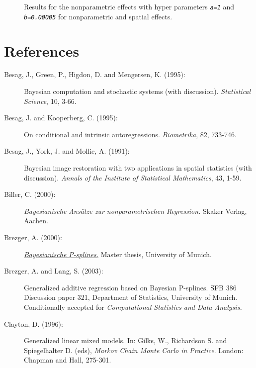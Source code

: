 \begin{figure}[ht]
\begin{center}
 {\it\caption{Results
for the nonparametric effects with hyper parameters {\em\tt a=1} and
{\em\tt b=0.00005} for nonparametric and spatial
effects.\label{zambia_mcmc_sensi3}}}
\end{center}
\end{figure}

\section{References}
\label{zambia_bayesregref}

\begin{description}

\item[Besag, J., Green, P., Higdon, D. and Mengersen, K. (1995):]
 Bayesian computation and stochastic systems (with discussion).
{\em Statistical Science}, 10, 3-66.

\item[Besag, J. and Kooperberg, C. (1995):] On conditional and intrinsic autoregressions.
{\em Biometrika}, 82, 733-746.

\item[Besag, J., York, J. and Mollie, A. (1991):]
Bayesian image restoration with two applications in spatial
statistics (with discussion). {\em Annals of the Institute of
Statistical Mathematics}, 43, 1-59.

\item[Biller, C. (2000):] {\em Bayesianische Ans\"atze zur nonparametrischen Regression.}
Skaker Verlag, Aachen.

\item[Brezger, A. (2000):] \href{http://www.stat.uni-muenchen.de/~andib}
{\em Bayesianische P-splines.} Master thesis, University of Munich.

\item[Brezger, A. and Lang, S. (2003):]
Generalized additive regression based on Bayesian P-splines. SFB
386 Discussion paper 321, Department of Statistics, University of
Munich. Conditionally accepted for {\em Computational Statistics and Data Analysis.}

\item[Clayton, D. (1996):] Generalized linear mixed models. In: Gilks, W., Richardson S. and
Spiegelhalter D. (eds), {\em Markov Chain Monte Carlo in
Practice}. London: Chapman and Hall, 275-301.


\end{description}
